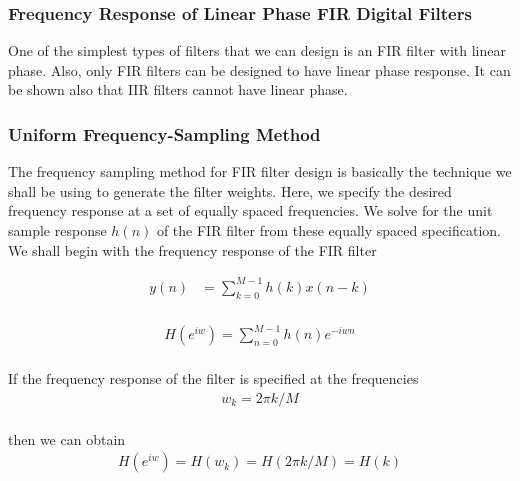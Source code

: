 \documentclass[a4paper,12pt]{article}
\begin{document}
\subsubsection{Frequency Response of Linear Phase FIR Digital Filters}
   One of the simplest types of filters that we can design is an FIR filter with linear phase. Also, only FIR filters can be designed to have linear phase response. It can be shown also that IIR filters cannot have linear phase.
   
\subsubsection{Uniform Frequency-Sampling Method}
   The frequency sampling method for FIR filter design is basically the technique we shall be using to generate the filter weights. Here, we specify the desired frequency response at a set of equally spaced frequencies. We solve for the unit sample response $h(n)$ of the FIR filter from these equally spaced specification.\cite{dsp}\\
   We shall begin with the frequency response of the FIR filter
   
   \begin{equation}  
   \begin{aligned}
  y(n) &= \sum_{k=0}^{M-1}h(k)x(n-k)\\
   \end{aligned} 
   \end{equation}
     
   \begin{equation}  
   \begin{aligned}
  H(e^{iw}) = \sum_{n=0}^{M-1}h(n)e^{-iwn}\\
   \end{aligned} 
   \end{equation}
     
   If the frequency response of the filter is specified at the frequencies
   \begin{equation}  
      \begin{aligned}
     w_k = 2\pi k/M\\
      \end{aligned} 
      \end{equation}
   
   then we can obtain
   \begin{equation}  
         \begin{aligned}
        H(e^{iw}) = H(w_k) = H(2\pi k/M) = H(k)\\
         \end{aligned} 
         \end{equation}
   	
\end{document}
